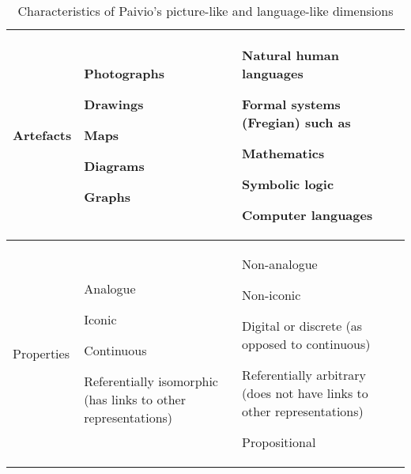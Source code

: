 \begin{table}[h]
	\begin{tabular}{| p{3.6cm} | p{3.6cm} | p{3.6cm} |}
	\hline
	Artefacts & 
	\begin{itemize*}
	\item[] Photographs
	\item[] Drawings
	\item[] Maps
	\item[] Diagrams
	\item[] Graphs
	\end{itemize*}
 & 
	\begin{itemize*}
	\item[] Natural human languages
	\item[] Formal systems (Fregian) such as
	\item[] Mathematics
	\item[] Symbolic logic
	\item[] Computer languages
	\end{itemize*}
 \\ \hline
 	Properties &
	\begin{itemize*}
		\item[] Analogue
		\item[] Iconic
		\item[] Continuous
		\item[] Referentially isomorphic (has links to other representations)
	\end{itemize*}
	& 
	\begin{itemize*}
		\item[] Non-analogue
		\item[] Non-iconic
		\item[] Digital or discrete (as opposed to continuous)
		\item[] Referentially arbitrary (does not have links to other representations)
		\item[] Propositional 
	\end{itemize*}
	\\ \hline
	\end{tabular}
\caption{Characteristics of Paivio's picture-like and language-like dimensions}
\end{table}

